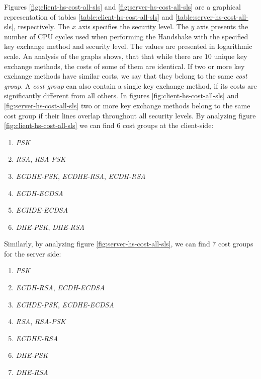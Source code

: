 Figures \ref{fig:client-hs-cost-all-sls} and \ref{fig:server-hs-cost-all-sls} are a graphical representation of tables \ref{table:client-hs-cost-all-sls}
and \ref{table:server-hs-cost-all-sls}, respectively. The $x$ axis specifies the security level. The $y$ axis presents the number
of CPU cycles used when performing the Handshake with the specified key exchange method and security level.
The values are presented in logarithmic scale.  An analysis of the graphs shows, that that while there are $10$ unique key 
exchange methods, the costs of some of them are identical.
If two or more key exchange methods have similar costs, we say that they belong to the same \textit{cost group}. A \textit{cost group}
can also contain a single key exchange method, if its costs are significantly different from all others. In figures
\ref{fig:client-hs-cost-all-sls} and \ref{fig:server-hs-cost-all-sls} two or more key exchange methods belong to the same
cost group if their lines overlap throughout all security levels. By analyzing figure \ref{fig:client-hs-cost-all-sls} we can
find $6$ cost groups at the client-side:

\begin{enumerate}
  \item \textit{PSK}
  \item \textit{RSA}, \textit{RSA-PSK}
  \item \textit{ECDHE-PSK}, \textit{ECDHE-RSA}, \textit{ECDH-RSA}
  \item \textit{ECDH-ECDSA}
  \item \textit{ECHDE-ECDSA}
  \item \textit{DHE-PSK}, \textit{DHE-RSA}
\end{enumerate}

Similarly, by analyzing figure \ref{fig:server-hs-cost-all-sls}, we can find $7$ cost groups for the server side:

\begin{enumerate}
  \item \textit{PSK}
  \item \textit{ECDH-RSA}, \textit{ECDH-ECDSA}
  \item \textit{ECHDE-PSK}, \textit{ECDHE-ECDSA}
  \item \textit{RSA}, \textit{RSA-PSK}
  \item \textit{ECDHE-RSA}
  \item \textit{DHE-PSK}
  \item \textit{DHE-RSA}
\end{enumerate}

